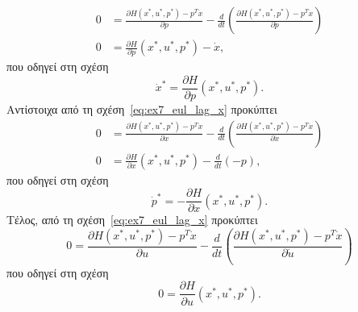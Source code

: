 \begin{solution}
    \begin{align*}
        0 &= \frac{\partial H(x^*, u^*, p^*) - p^{T}\dot{x}}{\partial p} -
        \frac{d}{dt}\left(
        \frac{\partial H(x^*, u^*, p^*) - p^{T}\dot{x}}{\partial \dot{p}}\right)
        \\
        0 &= \frac{\partial H}{\partial p} (x^*, u^*, p^*) - \dot{x},
    \end{align*}
    που οδηγεί στη σχέση
    \begin{equation}\label{eq:ex7_Hx_star}
        \dot{x}^* = \frac{\partial H}{\partial p} (x^*, u^*, p^*).
    \end{equation}
    Αντίστοιχα από τη σχέση~\eqref{eq:ex7_eul_lag_x} προκύπτει
    \begin{align*}
        0 &= \frac{\partial H(x^*, u^*, p^*) - p^{T}\dot{x}}{\partial x} -
        \frac{d}{dt}\left(
        \frac{\partial H(x^*, u^*, p^*) - p^{T}\dot{x}}{\partial \dot{x}}\right)
        \\
        0 &= \frac{\partial H}{\partial x} (x^*, u^*, p^*) - \frac{d}{dt}(-p),
    \end{align*}
    που οδηγεί στη σχέση
    \begin{equation}\label{eq:ex7_Hp_star}
        \dot{p}^* = -\frac{\partial H}{\partial x} (x^*, u^*, p^*).
    \end{equation}
    Τέλος, από τη σχέση~\eqref{eq:ex7_eul_lag_x} προκύπτει
    \[
        0 = \frac{\partial H(x^*, u^*, p^*) - p^{T}\dot{x}}{\partial u} -
        \frac{d}{dt}\left(
        \frac{\partial H(x^*, u^*, p^*) - p^{T}\dot{x}}{\partial \dot{u}}\right)
    \]
    που οδηγεί στη σχέση
    \begin{equation}\label{eq:ex7_Hu_star}
        0 = \frac{\partial H}{\partial u} (x^*, u^*, p^*).
    \end{equation}


\end{solution}
